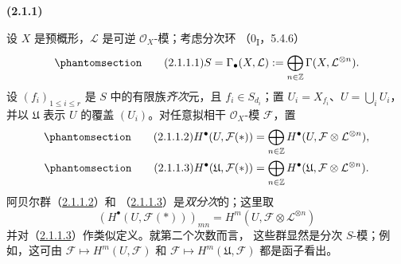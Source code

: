 \documentclass[UTF8,fontset=none,11pt,oneside,openany]{ctexbook}
\newenvironment{env}[1][]{%
  \par\medskip\noindent\textbf{(#1)}\ %
}{\par}
\let\EGAOriginalLabel\label
\renewcommand{\label}[1]{\phantomsection\EGAOriginalLabel{#1}}
\begin{document}
\begin{env}[2.1.1]
\label{III.2.1.1-fr}
设 $X$ 是预概形，$\mathcal L$ 是可逆 $\mathcal O_X$-模；考虑分次环
（0\textsubscript{I}，5.4.6）
\begin{equation}
\label{III.2.1.1.1-fr}
\tag{2.1.1.1}
S=\Gamma_\bullet(X,\mathcal L)
:=\bigoplus_{n\in\mathbb Z}\Gamma(X,\mathcal L^{\otimes n}).
\end{equation}
设 $(f_i)_{1\leq i\leq r}$ 是 $S$ 中的有限族\emph{齐次}元，且
$f_i\in S_{d_i}$；置 $U_i=X_{f_i}$、$U=\bigcup_iU_i$，并以
$\mathfrak U$ 表示 $U$ 的覆盖 $(U_i)$。对任意拟相干 $\mathcal O_X$-模
$\mathcal F$，置
\begin{align}
\label{III.2.1.1.2-fr}
\tag{2.1.1.2}
H^\bullet(U,\mathcal F(*))
&=\bigoplus_{n\in\mathbb Z}
H^\bullet(U,\mathcal F\otimes\mathcal L^{\otimes n}),\\
\label{III.2.1.1.3-fr}
\tag{2.1.1.3}
H^\bullet(\mathfrak U,\mathcal F(*))
&=\bigoplus_{n\in\mathbb Z}
H^\bullet(\mathfrak U,\mathcal F\otimes\mathcal L^{\otimes n}).
\end{align}
阿贝尔群（\hyperref[III.2.1.1.2-fr]{2.1.1.2}）和
（\hyperref[III.2.1.1.3-fr]{2.1.1.3}）是\emph{双分次}的；这里取
\[
(H^\bullet(U,\mathcal F(*)))_{mn}
=H^m(U,\mathcal F\otimes\mathcal L^{\otimes n})
\]
并对（\hyperref[III.2.1.1.3-fr]{2.1.1.3}）作类似定义。就第二个次数而言，
这些群显然是分次 $S$-模；例如，这可由
$\mathcal F\mapsto H^m(U,\mathcal F)$ 和
$\mathcal F\mapsto H^m(\mathfrak U,\mathcal F)$ 都是函子看出。
\end{env}
\end{document}
